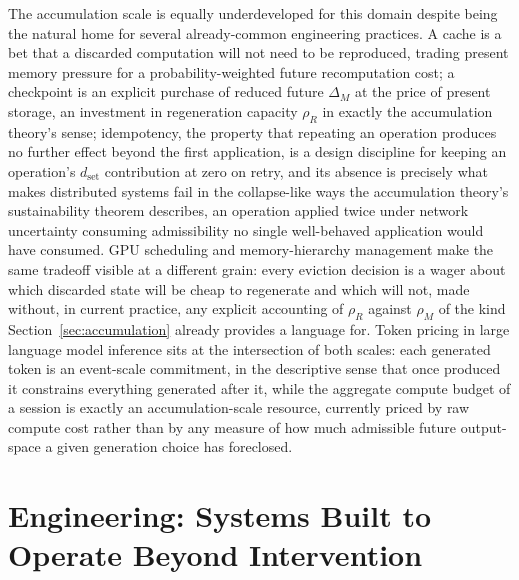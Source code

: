 \documentclass[11pt]{article}
\theoremstyle{plain}
\begin{document}
The accumulation scale is equally underdeveloped for this domain despite being the natural home for several already-common engineering practices. A cache is a bet that a discarded computation will not need to be reproduced, trading present memory pressure for a probability-weighted future recomputation cost; a checkpoint is an explicit purchase of reduced future $\Delta_M$ at the price of present storage, an investment in regeneration capacity $\rho_R$ in exactly the accumulation theory's sense; idempotency, the property that repeating an operation produces no further effect beyond the first application, is a design discipline for keeping an operation's $d_{\mathrm{set}}$ contribution at zero on retry, and its absence is precisely what makes distributed systems fail in the collapse-like ways the accumulation theory's sustainability theorem describes, an operation applied twice under network uncertainty consuming admissibility no single well-behaved application would have consumed. GPU scheduling and memory-hierarchy management make the same tradeoff visible at a different grain: every eviction decision is a wager about which discarded state will be cheap to regenerate and which will not, made without, in current practice, any explicit accounting of $\rho_R$ against $\rho_M$ of the kind Section~\ref{sec:accumulation} already provides a language for. Token pricing in large language model inference sits at the intersection of both scales: each generated token is an event-scale commitment, in the descriptive sense that once produced it constrains everything generated after it, while the aggregate compute budget of a session is exactly an accumulation-scale resource, currently priced by raw compute cost rather than by any measure of how much admissible future output-space a given generation choice has foreclosed.

\section{Engineering: Systems Built to Operate Beyond Intervention}
\label{sec:engineering}
\end{document}
